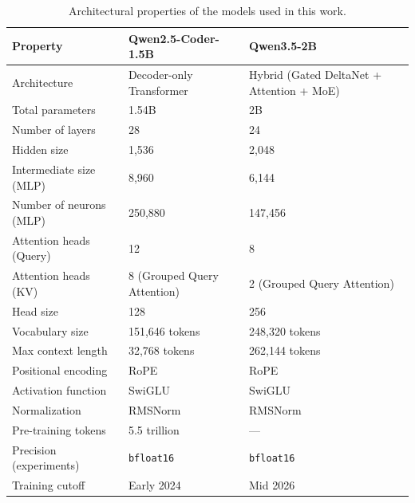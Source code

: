\documentclass[mscthesis]{usiinfthesis}
\begin{document}
\begin{table}[ht]
\centering
\begin{tabular}{lll}
\toprule
\textbf{Property} & \textbf{Qwen2.5-Coder-1.5B} & \textbf{Qwen3.5-2B}\\
\midrule
\multirow{2}{13em}{Architecture} & \multirow{2}{10em}{Decoder-only Transformer} & \multirow{2}{11em}{Hybrid (Gated DeltaNet + Attention + MoE)} \\
& & \\
Total parameters        & 1.54B                                       & 2B \\
Number of layers        & 28                                          & 24 \\
Hidden size             & 1,536                                     & 2,048 \\
Intermediate size (MLP) & 8,960                                     & 6,144 \\
Number of neurons (MLP) & 250,880                                    & 147,456 \\
Attention heads (Query) & 12                                        & 8 \\
\multirow{2}{10em}{Attention heads (KV)} & \multirow{2}{8em}{8 (Grouped Query Attention)} & \multirow{2}{8em}{2 (Grouped Query Attention)} \\
& & \\
Head size               & 128                                        & 256 \\
Vocabulary size         & 151,646 tokens                      & 248,320 tokens \\
Max context length      & 32,768 tokens                        & 262,144 tokens \\
Positional encoding     & RoPE                                          & RoPE \\
Activation function     & SwiGLU                                      & SwiGLU \\
Normalization           & RMSNorm                          & RMSNorm \\
Pre-training tokens     & 5.5 trillion                           & --- \\
Precision (experiments) & \texttt{bfloat16}                & \texttt{bfloat16} \\
Training cutoff         & Early 2024                              & Mid 2026 \\
\bottomrule
\end{tabular}
\caption{Architectural properties of the models used in this work.
\citep{hui2024qwen25codertechnicalreport, qwen3.5}}
\label{tab:model_architecture}
\end{table}
\end{document}
